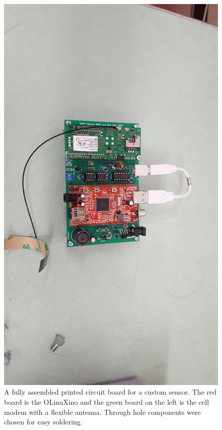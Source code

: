 \begin{figure}[ht]
\includegraphics[width=\textwidth]{figs/sensor_board.jpg}
\caption[Assembled sensor circuit board]{A fully assembled printed
  circuit board for a custom sensor. The red board is the OLinuXino
  and the green board on the left is the cell modem with a flexible
  antenna. Through hole components were chosen for easy soldering.}
\label{fig:sensor_board}
\end{figure}

